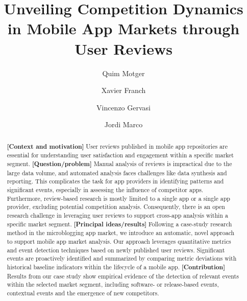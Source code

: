 \documentclass[runningheads]{llncs}
\begin{document}
%
\title{Unveiling Competition Dynamics in Mobile App Markets through User Reviews}

%
%
\author{%
  Quim Motger \and
  Xavier Franch \and
  Vincenzo Gervasi \and Jordi Marco}
%
%
%
\maketitle              %
%
\vskip -6pt
\begin{abstract}
\textbf{[Context and motivation]} User reviews published in mobile app repositories are essential for understanding user satisfaction and engagement within a specific market segment. 
\textbf{[Question/problem]} Manual analysis of reviews is impractical due to the large data volume, and automated analysis faces challenges like data synthesis and reporting. This complicates the task for app providers in identifying patterns and significant events, especially in assessing the influence of competitor apps. 
Furthermore, review-based research is mostly limited to a single app or a single app provider, excluding potential competition analysis. 
Consequently, there is an open research challenge in leveraging user reviews to support cross-app analysis within a specific market segment.
\textbf{[Principal ideas/results]} Following a case-study research method in the microblogging app market, we introduce an automatic, novel approach to support mobile app market analysis. %
Our approach leverages quantitative metrics and event detection techniques based on newly published user reviews. 
Significant events are proactively identified and summarized by comparing metric deviations with historical baseline indicators within the lifecycle of a mobile app. 
\textbf{[Contribution]} Results from our case study show empirical evidence of the detection of relevant events within the selected market segment, including software- or release-based events, contextual events and the emergence of new competitors.
\end{abstract}



\end{document}
